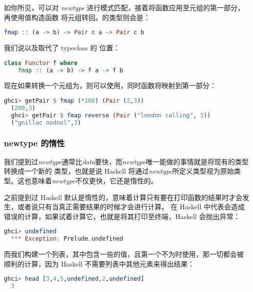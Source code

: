 \documentclass[./main.tex]{subfiles}
\begin{document}
如你所见，可以对 \textit{newtype} 进行模式匹配，接着将函数应用至元组的第一部分，再使用值构造函数
将元组转回。的类型则会是：

\begin{lstlisting}[language=Haskell]
  fmap :: (a -> b) -> Pair c a -> Pair c b
\end{lstlisting}

我们说以及取代了 typeclass 的
位置：

\begin{lstlisting}[language=Haskell]
  class Functor f where
    fmap :: (a -> b) -> f a -> f b
\end{lstlisting}

现在如果转换一个元组为，则可以使用，同时函数将映射到第一部分：

\begin{lstlisting}[language=Haskell]
  ghci> getPair $ fmap (*100) (Pair (2,3))
  (200,3)
  ghci> getPair $ fmap reverse (Pair ("london calling", 3))
  ("gnillac nodnol",3)
\end{lstlisting}

\subsubsection*{newtype 的惰性}

我们提到过\textit{newtype}通常比\textit{data}要快，而\textit{newtype}唯一能做的事情就是将现有的类型转换成一个新的
类型，也就是说 Haskell 将通过\textit{newtype}所定义类型视为原始类型。这也意味着\textit{newtype}不仅更快，它还是惰性的。

之前提到过 Haskell 默认是惰性的，意味着计算只有要在打印函数的结果时才会发生，或者说只有当真正需要结果的时候才会进行计算。
在 Haskell 中代表会造成错误的计算，如果试着计算它，也就是将其打印至终端，Haskell 会抛出异常：

\begin{lstlisting}[language=Haskell]
  ghci> undefined
  *** Exception: Prelude.undefined
\end{lstlisting}

而我们构建一个列表，其中包含一些的值，且第一个不为时使用，那一切都会被
顺利的计算，因为 Haskell 不需要列表中其他元素来得出结果：

\begin{lstlisting}[language=Haskell]
  ghci> head [3,4,5,undefined,2,undefined]
  3
\end{lstlisting}
\end{document}

